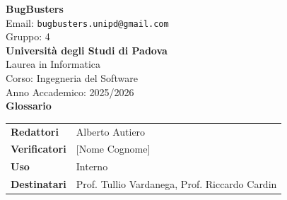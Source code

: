 \documentclass[a4paper,11pt]{article}
\begin{document}
\pagestyle{fancy}
\fancyhf{}
\renewcommand{\headrulewidth}{0pt}
\renewcommand{\footrulewidth}{0pt}

\begin{center}
  \thispagestyle{empty}
  {\Large\bfseries BugBusters}\\[0.3cm]
  {\small\color{darkgray} Email: \texttt{bugbusters.unipd@gmail.com}} \\[0.1cm]
  {\small\color{darkgray} Gruppo: 4} \\[0.5cm]

  {\large\bfseries Università degli Studi di Padova}\\[0.3cm]
  {\small Laurea in Informatica}\\[0.2cm]
  {\small Corso: Ingegneria del Software}\\[0.2cm]
  {\small Anno Accademico: 2025/2026}\\[0.8cm]

  {\Huge\bfseries Glossario}\\[0.8cm]
\end{center}

\begin{center}
\begin{tcolorbox}[colback=lightgray,width=0.85\textwidth,arc=3mm,boxrule=0.5pt]
\begin{tabular}{@{}ll@{}}
\textbf{Redattori}    & Alberto Autiero \\
\textbf{Verificatori} & [Nome Cognome] \\
\textbf{Uso}          & Interno \\
\textbf{Destinatari}  & Prof. Tullio Vardanega, Prof. Riccardo Cardin \\
\end{tabular}
\end{tcolorbox}
\end{center}
\end{document}
